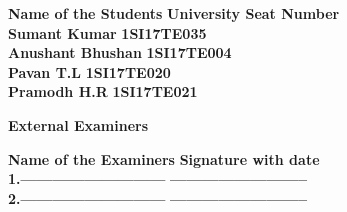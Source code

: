 \begin{singlespacing}
\vspace*{1cm}
\begin{flushleft}
\textbf {Name of the Students} \hspace{6cm}\textbf{University Seat Number} \\
\textbf {Sumant Kumar} \hspace{7cm}\textbf{1SI17TE035} \\
\textbf {Anushant Bhushan} \hspace{6.4cm}\textbf{1SI17TE004} \\
\textbf {Pavan T.L} \hspace{8cm}\textbf{1SI17TE020} \\
\textbf {Pramodh H.R} \hspace{7.35cm}\textbf{1SI17TE021} \\
\end{flushleft}
\vspace{1cm}
\begin{center}
	\textbf{ External Examiners}
\end{center}
\begin{flushleft}
	\textbf {Name of the Examiners} \hspace{6cm}\textbf{Signature with date} \\
	\vspace{0.5cm}
	\textbf {1.---------------------------} \hspace{6.2cm}\textbf{--------------------------}\\ \vspace{0.5cm}
	\textbf {2.---------------------------} \hspace{6.2cm}\textbf{--------------------------} \\
\end{flushleft}
\end{singlespacing} 
